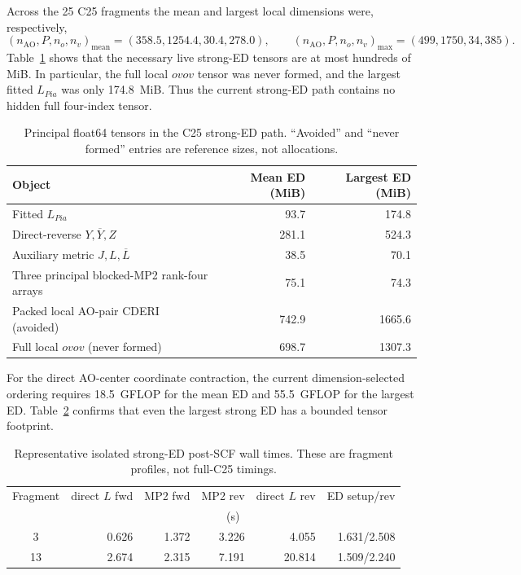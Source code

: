 \documentclass[11pt]{article}
\begin{document}
Across the 25 C25 fragments the mean and largest local dimensions were,
respectively,
\begin{equation*}
 (n_{\mathrm{AO}},P,n_o,n_v)_{\mathrm{mean}}
 =(358.5,1254.4,30.4,278.0),\qquad
 (n_{\mathrm{AO}},P,n_o,n_v)_{\max}=(499,1750,34,385).
\end{equation*}
Table~\ref{tab:c25-ed-tensors} shows that the
necessary live strong-ED tensors are at most hundreds of MiB.  In particular,
the full local $ovov$ tensor was never formed, and the largest fitted
$L_{Pia}$ was only 174.8~MiB.  Thus the current strong-ED path contains no
hidden full four-index tensor.

\begin{table}[htbp]
 \centering
 \caption{Principal float64 tensors in the C25 strong-ED path.  ``Avoided''
 and ``never formed'' entries are reference sizes, not allocations.}
 \label{tab:c25-ed-tensors}
 \scriptsize
 \begin{tabular}{@{}lrr@{}}
  \toprule
  Object & Mean ED (MiB) & Largest ED (MiB) \\
  \midrule
  Fitted $L_{Pia}$ & 93.7 & 174.8 \\
  Direct-reverse $Y,\overline Y,Z$ & 281.1 & 524.3 \\
  Auxiliary metric $J,L,\overline L$ & 38.5 & 70.1 \\
  Three principal blocked-MP2 rank-four arrays & 75.1 & 74.3 \\
  Packed local AO-pair CDERI (avoided) & 742.9 & 1665.6 \\
  Full local $ovov$ (never formed) & 698.7 & 1307.3 \\
  \bottomrule
 \end{tabular}
\end{table}

For the direct AO-center coordinate contraction, the current
dimension-selected ordering requires 18.5~GFLOP for the mean ED and
55.5~GFLOP for the largest ED.  Table~\ref{tab:c25-strong-profile} confirms
that even the largest strong ED has a bounded tensor footprint.

\begin{table}[htbp]
 \centering
 \caption{Representative isolated strong-ED post-SCF wall times.  These are
 fragment profiles, not full-C25 timings.}
 \label{tab:c25-strong-profile}
 \scriptsize
 \setlength{\tabcolsep}{3.5pt}
 \begin{tabular}{@{}crrrrr@{}}
  \toprule
  Fragment & direct $L$ fwd & MP2 fwd & MP2 rev & direct $L$ rev & ED setup/rev \\
  & \multicolumn{5}{c}{(s)} \\
  \midrule
  3  & 0.626 & 1.372 & 3.226 & 4.055 & 1.631/2.508 \\
  13 & 2.674 & 2.315 & 7.191 & 20.814 & 1.509/2.240 \\
  \bottomrule
 \end{tabular}
\end{table}
\end{document}
